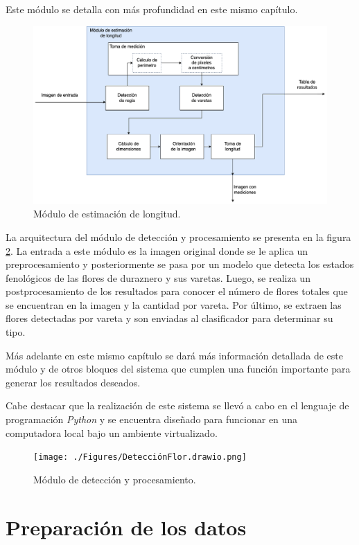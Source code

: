 Este módulo se detalla con más profundidad en este mismo capítulo.

\begin{figure}[htpb]
	\centering
	\includegraphics[scale=.35]{./Figures/medicionVareta.drawio.png}
	\caption{Módulo de estimación de longitud.}
	\label{fig:varetaSize}
\end{figure}

La arquitectura del módulo de detección y procesamiento se presenta en la figura \ref{fig:densidadDeFlores}. La entrada a este módulo es la imagen original donde se le aplica un preprocesamiento y posteriormente se pasa por un modelo que detecta los estados fenológicos de las flores de duraznero y sus varetas. Luego, se realiza un postprocesamiento de los resultados para conocer el número de flores totales que se encuentran en la imagen y la cantidad por vareta. Por último, se extraen las flores detectadas por vareta y son enviadas al clasificador para determinar su tipo.

Más adelante en este mismo capítulo se dará más información detallada de este módulo y de otros bloques del sistema que cumplen una función importante para generar los resultados deseados.

Cabe destacar que la realización de este sistema se llevó a cabo en el lenguaje de programación \textit{Python} y se encuentra diseñado para funcionar en una computadora local bajo un ambiente virtualizado. 

\begin{figure}[htp]
	\centering
	\texttt{[image: ./Figures/DetecciónFlor.drawio.png]}
	\caption{Módulo de detección y procesamiento.}
	\label{fig:densidadDeFlores}
\end{figure}
\newpage
\section{Preparación de los datos}

